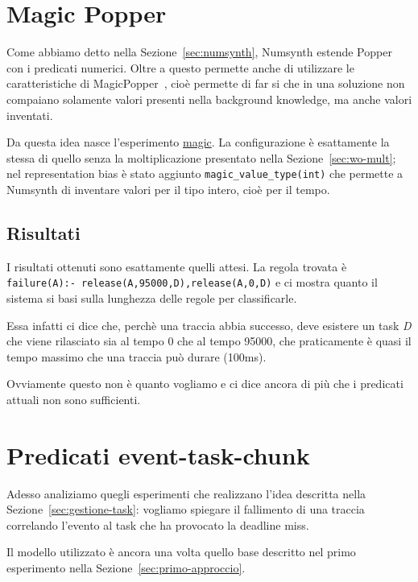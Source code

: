 \section{Magic Popper}
\label{sec:magic-popper}
Come abbiamo detto nella Sezione~\ref{sec:numsynth}, Numsynth estende Popper con i predicati numerici. Oltre a questo permette anche di utilizzare le caratteristiche di MagicPopper~\cite{hocquette2023learning}, cioè permette di far si che in una soluzione non compaiano solamente valori presenti nella background knowledge, ma anche valori inventati.

Da questa idea nasce l'esperimento \href{https://github.com/edoardosarri24/numsynth/tree/main/my-experiments/5-magic/}{magic}. La configurazione è esattamente la stessa di quello senza la moltiplicazione presentato nella Sezione~\ref{sec:wo-mult}; nel representation bias è stato aggiunto \texttt{magic\_value\_type(int)} che permette a Numsynth di inventare valori per il tipo intero, cioè per il tempo.

\subsection{Risultati}
I risultati ottenuti sono esattamente quelli attesi. La regola trovata è \texttt{failure(A):- release(A,95000,D),release(A,0,D)} e ci mostra quanto il sistema si basi sulla lunghezza delle regole per classificarle.

Essa infatti ci dice che, perchè una traccia abbia successo, deve esistere un task \textit{D} che viene rilasciato sia al tempo 0 che al tempo 95000, che praticamente è quasi il tempo massimo che una traccia può durare (100ms).

Ovviamente questo non è quanto vogliamo e ci dice ancora di più che i predicati attuali non sono sufficienti.

\section{Predicati event-task-chunk}
\label{sec:event_task_chunk}
Adesso analiziamo quegli esperimenti che realizzano l'idea descritta nella Sezione~\ref{sec:gestione-task}: vogliamo spiegare il fallimento di una traccia correlando l'evento al task che ha provocato la deadline miss.

Il modello utilizzato è ancora una volta quello base descritto nel primo esperimento nella Sezione~\ref{sec:primo-approccio}.

\myskip

